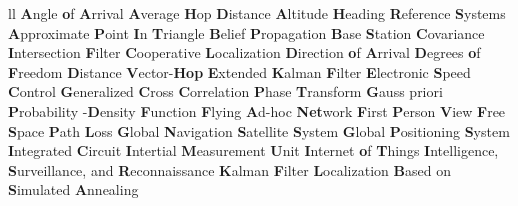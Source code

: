 \documentclass[
	12pt, %
	english, %
	onehalfspacing, %
	liststotoc, %
	toctotoc, %
	parskip, %
	headsepline, %
]{MastersDoctoralThesis} %
\begin{document}
\begin{abbreviations}{ll} %
			{\textbf{A}ngle \textbf{o}f \textbf{A}rrival}
			{\textbf{A}verage \textbf{H}op \textbf{D}istance} 
			{\textbf{A}ltitude \textbf{H}eading \textbf{R}eference \textbf{S}ystems}
			{\textbf{A}pproximate \textbf{P}oint \textbf{I}n \textbf{T}riangle}
				{\textbf{B}elief \textbf{P}ropagation} 
				{\textbf{B}ase \textbf{S}tation}
			{\textbf{C}ovariance \textbf{I}ntersection \textbf{F}ilter}   
				{\textbf{C}ooperative \textbf{L}ocalization}
			{\textbf{D}irection \textbf{o}f \textbf{A}rrival}
			{\textbf{D}egrees \textbf{o}f \textbf{F}reedom}
			{\textbf{D}istance \textbf{V}ector-\textbf{Hop}}
			{\textbf{E}xtended \textbf{K}alman \textbf{F}ilter}
			{\textbf{E}lectronic \textbf{S}peed \textbf{C}ontrol}
		{\textbf{G}eneralized \textbf{C}ross \textbf{C}orrelation \textbf{P}hase \textbf{T}ransform}
			{\textbf{G}auss priori \textbf{P}robability -\textbf{D}ensity \textbf{F}unction}
			{\textbf{F}lying \textbf{A}d-hoc \textbf{Net}work}
			{\textbf{F}irst \textbf{P}erson \textbf{V}iew}
			{\textbf{F}ree \textbf{S}pace \textbf{P}ath \textbf{L}oss}
			{\textbf{G}lobal \textbf{N}avigation \textbf{S}atellite \textbf{S}ystem}
			{\textbf{G}lobal \textbf{P}ositioning \textbf{S}ystem}
				{\textbf{I}ntegrated  \textbf{C}ircuit}
			{\textbf{I}ntertial \textbf{M}easurement \textbf{U}nit}
			{\textbf{I}nternet \textbf{o}f \textbf{T}hings}
			{\textbf{I}ntelligence, \textbf{S}urveillance, and \textbf{R}econnaissance}
				{\textbf{K}alman \textbf{F}ilter}
			{\textbf{L}ocalization \textbf{B}ased on \textbf{S}imulated \textbf{A}nnealing}

\end{abbreviations}
\end{document}
